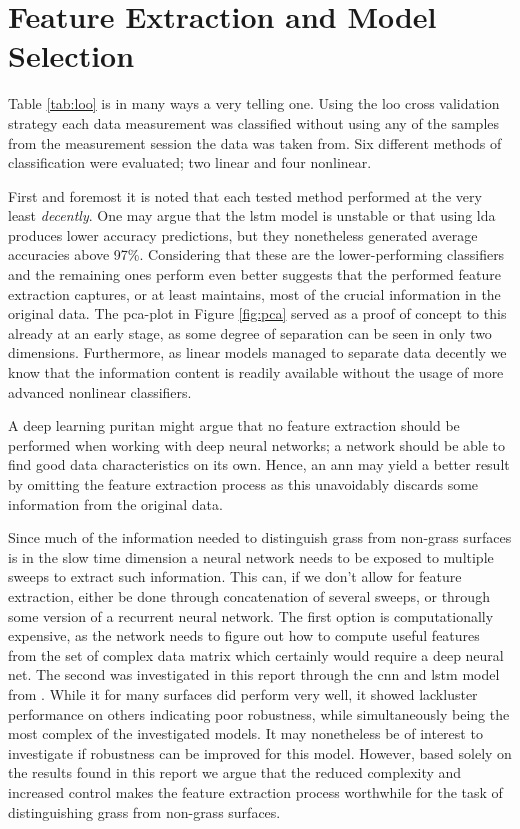 \section{Feature Extraction and Model Selection}
\label{disc_feat}
Table \ref{tab:loo} is in many ways a very telling one. Using the \gls{loo} cross validation strategy each data measurement was classified without using any of the samples from the measurement session the data was taken from. Six different methods of classification were evaluated; two linear and four nonlinear. 

First and foremost it is noted that each tested method performed at the very least \emph{decently}. One may argue that the \gls{lstm} model is unstable or that using \gls{lda} produces lower accuracy predictions, but they nonetheless generated average accuracies above 97\%. Considering that these are the lower-performing classifiers and the remaining ones perform even better suggests that the performed feature extraction captures, or at least maintains, most of the crucial information in the original data. The \gls{pca}-plot in Figure \ref{fig:pca} served as a proof of concept to this already at an early stage, as some degree of separation can be seen in only two dimensions. Furthermore, as linear models managed to separate data decently we know that the information content is readily available without the usage of more advanced nonlinear classifiers. 

A deep learning puritan might argue that no feature extraction should be performed when working with deep neural networks; a network should be able to find good data characteristics on its own. Hence, an \gls{ann} may yield a better result by omitting the feature extraction process as this unavoidably discards some information from the original data. 

Since much of the information needed to distinguish grass from non-grass surfaces is in the slow time dimension a neural network needs to be exposed to multiple sweeps to extract such information. This can, if we don't allow for feature extraction, either be done through concatenation of several sweeps, or through some version of a recurrent neural network. The first option is computationally expensive, as the network needs to figure out how to compute useful features from the set of complex data matrix which certainly would require a deep neural net. The second was investigated in this report through the \gls{cnn} and \gls{lstm} model from \citep{karim_majumdar_darabi_chen_2018}. While it for many surfaces did perform very well, it showed lackluster performance on others indicating poor robustness, while simultaneously being the most complex of the investigated models. It may nonetheless be of interest to investigate if robustness can be improved for this model. However, based solely on the results found in this report we argue that the reduced complexity and increased control makes the feature extraction process worthwhile for the task of distinguishing grass from non-grass surfaces.  

